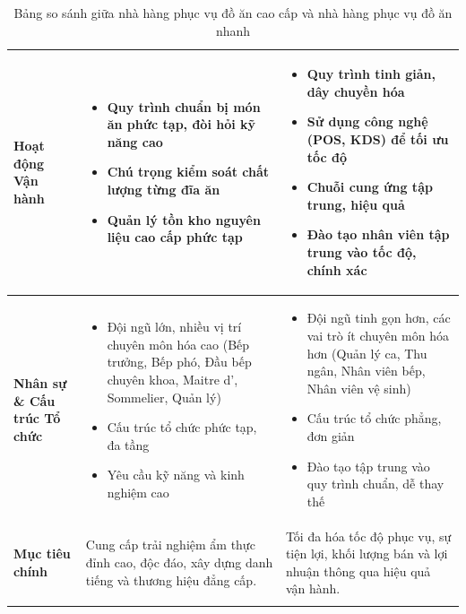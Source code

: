 \begin{longtable}{| m{3.5cm} | >{\RaggedRight}m{6.5cm} | >{\RaggedRight}m{6.5cm} |}
\textbf{Hoạt động Vận hành} & \begin{itemize} \item Quy trình chuẩn bị món ăn phức tạp, đòi hỏi kỹ năng cao \item Chú trọng kiểm soát chất lượng từng đĩa ăn \item Quản lý tồn kho nguyên liệu cao cấp phức tạp \end{itemize} & \begin{itemize} \item Quy trình tinh giản, dây chuyền hóa \item Sử dụng công nghệ (POS, KDS) để tối ưu tốc độ \item Chuỗi cung ứng tập trung, hiệu quả \item Đào tạo nhân viên tập trung vào tốc độ, chính xác \end{itemize} \\
\hline
\textbf{Nhân sự \& Cấu trúc Tổ chức} & \begin{itemize} \item Đội ngũ lớn, nhiều vị trí chuyên môn hóa cao (Bếp trưởng, Bếp phó, Đầu bếp chuyên khoa, Maitre d', Sommelier, Quản lý) \item Cấu trúc tổ chức phức tạp, đa tầng \item Yêu cầu kỹ năng và kinh nghiệm cao \end{itemize} & \begin{itemize} \item Đội ngũ tinh gọn hơn, các vai trò ít chuyên môn hóa hơn (Quản lý ca, Thu ngân, Nhân viên bếp, Nhân viên vệ sinh) \item Cấu trúc tổ chức phẳng, đơn giản \item Đào tạo tập trung vào quy trình chuẩn, dễ thay thế \end{itemize} \\
\hline
\textbf{Mục tiêu chính} & Cung cấp trải nghiệm ẩm thực đỉnh cao, độc đáo, xây dựng danh tiếng và thương hiệu đẳng cấp. & Tối đa hóa tốc độ phục vụ, sự tiện lợi, khối lượng bán và lợi nhuận thông qua hiệu quả vận hành. \\
\hline %

\caption{Bảng so sánh giữa nhà hàng phục vụ đồ ăn cao cấp và nhà hàng phục vụ đồ ăn nhanh}
\label{tab:comparison_detail} \\
\end{longtable}



